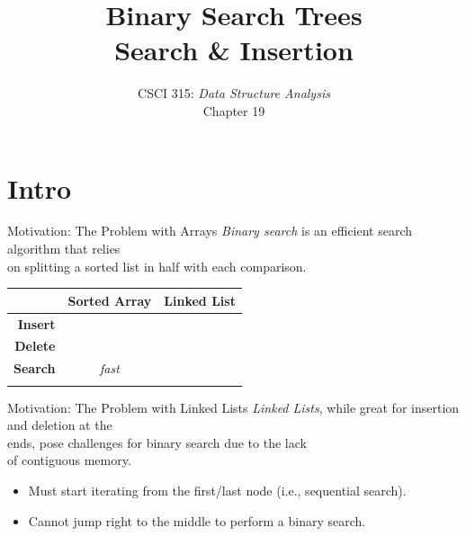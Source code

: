 \documentclass[14pt,aspectratio=1610]{beamer}
\title{\Huge{} Binary Search Trees\\Search \& Insertion}
\subtitle{CSCI 315: \textit{Data Structure Analysis}\\Chapter 19}
\institute{Charleston Southern University}
\begin{document}
\begin{frame}
  \titlepage{}
\end{frame}

\section*{Intro}

\begin{frame}{Motivation: The Problem with Arrays}
  \emph{Binary search} is an efficient search algorithm that relies\\ on splitting a sorted list in half with each comparison.

  \begin{tabular}{rcc}
    \toprule{}
                           & \textbf{Sorted Array} & \textbf{Linked List} \\
    \midrule{}
    \textbf{Insert}        & \color{CSUgold}{slow} & \color{CSUgold}{slow}  \\
    \textbf{Delete}        & \color{CSUgold}{slow} & \color{CSUgold}{slow}  \\
    \textbf{Search}        & \emph{fast}           & \color{CSUgold}{slow}  \\
    \bottomrule{}
  \end{tabular}
\end{frame}

\begin{frame}{Motivation: The Problem with Linked Lists}
  \emph{Linked Lists}, while great for insertion and deletion at the\\
  ends, pose challenges for binary search due to the lack\\
  of contiguous memory.

  \begin{itemize}
    \item 
      Must start iterating from the first/last node (i.e., sequential search).
    \item
      Cannot jump right to the middle to perform a binary search.
  \end{itemize}
\end{frame}
\end{document}
